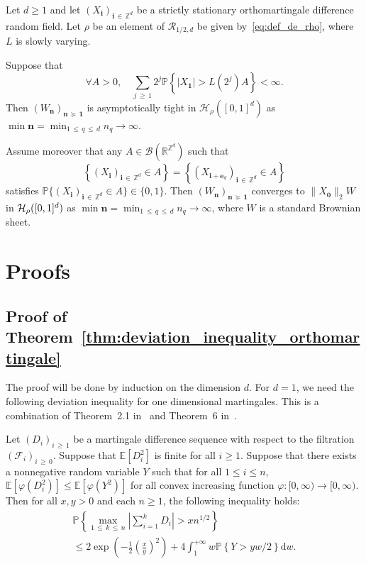 \documentclass[AHL,Unicode,longabstracts,published]{cedram}
\newcommand{\Fca}{\mathcal{F}}
\newcommand{\Hca}{\mathcal{H}}
\newcommand{\Rca}{\mathcal{R}}
\newcommand{\clB}{\mathcal{B}}
\newcommand{\rmd}{\mathrm{d}}
\newcommand\R{\mathbb{R}}
\newcommand\PP{\mathbb{P}}
\newcommand\Z{\mathbb{Z}}
\newcommand{\E}[1]{\mathbb E[#1]}
\newcommand\ens[1]{\{ #1\}}
\newcommand{\pr}[1]{(#1)}
\newcommand{\norm}[1]{\lVert #1\rVert}
\newcommand{\gr}[1]{\bm{#1}}
\newcommand{\gri}{\bm{i}}
\newcommand{\grn}{\bm{n}}
\newcommand{\smd}{\succcurlyeq }
\let\oldforall\forall
\renewcommand*{\forall}{\mathrel{\oldforall}}
\begin{document}
\begin{theo}\label{thm:WIP_Holder}
Let $d\geq 1$ and let $\pr{X_{\gri}}_{\gri\,\in\,\Z^d}$ be a strictly stationary orthomartingale difference random field. Let $\rho$ be an element of $\Rca_{1/2,d}$ be given by~\eqref{eq:def_de_rho}, where $L$ is slowly varying.

Suppose that
\begin{equation}\label{eq:cond_suff_WIP}
\forall A>0, \quad\sum_{j\,\geq\,1}2^j\PP\left\{\left|X_{\gr{1}}\right|>L\left(2^j\right)A\right\}<\infty.
\end{equation}
Then $\pr{W_{\grn}}_{\grn\,\smd\,\gr{1}}$ is asymptotically tight in $\Hca_\rho\pr{[0,1]^d}$ as $\min\grn=
\min_{1\,\leq\,q\,\leq\,d}n_q\to\infty$.

Assume moreover that any $A\in\clB\pr{\R^{\Z^d}}$ such that 
\[
\left\{\left(X_{\gri}\right)_{\gri\,\in\,\Z^d}\in A\right\}=\left\{\left(X_{\gri+\gr{e}_d}\right)_{\gri\,\in\,\Z^d}\in A\right\}
\]
satisfies $\PP\ens{\pr{X_{\gri}}_{\gri\,\in\,\Z^d}\in A}\in\ens{0,1}$. Then $\pr{W_{\grn}}_{\grn\,\smd\,\gr{1}}$ converges to $\norm{X_{\gr{0}}}_2 W$ in $\Hca_\rho\linebreak\pr{[0,1]^d}$ as $\min\grn=
\min_{1\,\leq\,q\,\leq\,d}n_q\to\infty$, where $W$ is a standard Brownian sheet.
\end{theo}


\section{Proofs}\label{sec:proofs}


\subsection{Proof of Theorem~\ref{thm:deviation_inequality_orthomartingale}}

The proof will be done by induction on the dimension $d$. For $d=1$, we need the following deviation inequality for one dimensional martingales. This is a combination of Theorem~2.1 in~\cite{MR3311214} and Theorem~6 in~\cite{MR606989}.

\begin{prop}\label{prop:inegalite_deviation_martingales_dominee}
Let $\pr{D_i}_{i\,\geq\,1}$ be a martingale difference sequence with respect to the filtration $\pr{\Fca_i}_{i\,\geq\,0}$. Suppose that $\E{D_i ^2}$ is finite for all $i\geq 1$. Suppose that there exists a nonnegative random variable $Y$ such that for all $1\leq i\leq n$, $\E{\varphi\pr{D_i^2}}\leq\E{\varphi\pr{Y^2}}$ for all convex increasing function $\varphi\colon [0,\infty)\to[0,\infty)$. Then for all $x,y>0$ and each $n\geq 1$, the following inequality holds:
\begin{multline}\label{eq:inegalite_max_martingales_moments_ordre_p_domination_sto}
\PP\left\{\max_{1\,\leq\,k\,\leq\,n}\left|\sum_{i=1}^kD_i\right|>x n^{1/2} \right\}
\\
\leq 2\exp\left(-\frac 12\left(\frac{x}{y}\right)^{2} \right)
+ 4\int_{1 }^{+\infty}w\PP\left\{ Y>yw/2\right\}\rmd w.
\end{multline}
\end{prop}
\end{document}
